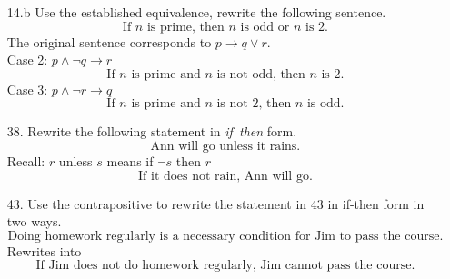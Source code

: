 \documentclass[12pt]{article}
\begin{document}
\begin{enumerate}
\begin{enumerate}
            \item[14.b] Use the established equivalence, rewrite the following sentence.
            \[
            \text{If $n$ is prime, then $n$ is odd or $n$ is 2.}
            \]
            The original sentence corresponds to $p \rightarrow q\vee r$.\\
            Case 2: $p \wedge \neg q \rightarrow r$
            \[
            \text{If $n$ is prime and $n$ is not odd, then $n$ is 2.}
            \]
            Case 3: $p\wedge \neg r \rightarrow q$
            \[
            \text{If $n$ is prime and $n$ is not 2, then $n$ is odd.}
            \]

        \newpage
        \item[38.] Rewrite the following statement in \textit{if~then} form.
        \[
        \text{Ann will go unless it rains.}
        \]
        Recall: $r$ unless $s$ means if $\neg s$ then $r$
        \[
        \text{If it does not rain, Ann will go.}
        \]

        \item[43.] Use the contrapositive to rewrite the statement in 43 in if-then form in two ways.
        \[
        \text{Doing homework regularly is a necessary condition for Jim to pass the course.}
        \]
        Rewrites into
        \[
        \text{If Jim does not do homework regularly, Jim cannot pass the course.}
        \]
        \end{enumerate}






\end{enumerate}
\end{document}
